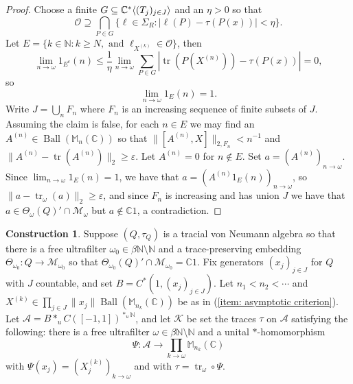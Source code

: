 \documentclass[10pt]{amsart}
\theoremstyle{definition}
\newtheorem{cons}[thm]{Construction}
\numberwithin{equation}{section}
\newcommand{\bC}{{\mathbb C}}
\newcommand{\bF}{{\mathbb F}}
\newcommand{\bM}{{\mathbb M}}
\newcommand{\bN}{{\mathbb N}}
\newcommand{\cA}{{\mathcal A}}
\newcommand{\cK}{{\mathcal K}}
\newcommand{\cM}{{\mathcal M}}
\DeclareMathOperator{\tr}{tr}
\DeclareMathOperator{\Ball}{Ball}
\DeclarePairedDelimiter{\ip}{\langle}{\rangle}
\begin{document}
\begin{proof}
Choose a finite $G\subseteq \bC^{*}\ip{(T_{j})_{j\in J}}$ and an $\eta>0$ so that 
\[\mathcal{O}\supseteq \bigcap_{P\in G}\{\ell\in \Sigma_{R}:|\ell(P)-\tau(P(x))|<\eta\}.\]
Let $E=\{k\in \bN:k\geq N, \text{ and }\ell_{X^{(k)}}\in \mathcal{O}\}$, then
\[\lim_{n\to\omega}1_{E^{c}}(n)\leq \frac{1}{\eta}\lim_{n\to\omega}\sum_{P\in G}|\tr(P(X^{(n)}))-\tau(P(x))|=0,\]
so
\[\lim_{n\to\omega}1_{E}(n)=1.\]
Write $J=\bigcup_{n}F_{n}$ where $F_{n}$ is an increasing sequence of finite subsets of $J$. Assuming the claim is false, for each $n\in E$  we may find an $A^{(n)}\in \Ball(\bM_{n}(\bC))$ so that $\|[A^{(n)},X]\|_{2,F_{n}}<n^{-1}$ and $\|A^{(n)}-\tr(A^{(n)})\|_{2}\geq \varepsilon$. Let $A^{(n)}=0$ for $n\notin E$.
Set $a=(A^{(n)})_{n\to\omega}$. Since $\lim_{n\to\omega}1_{E}(n)=1$, we have that $a=(A^{(n)}1_{E}(n))_{n\to\omega}$, so $\|a-\tr_{\omega}(a)\|_{2}\geq \varepsilon$, and since $F_{n}$ is increasing and has union $J$ we have that $a\in \Theta_{\omega}(Q)'\cap \cM_{\omega}$ but $a\notin \bC1$, a contradiction. 

     
\end{proof}

\begin{cons}\label{cons: preliminary construction}
Suppose $(Q,\tau_{Q})$ is a tracial von Neumann algebra so that there is a free ultrafilter $\omega_{0}\in \beta\bN\setminus\bN$ and a trace-preserving embedding $\Theta_{\omega_{0}}\colon Q\to \cM_{\omega_{0}}$ so that $\Theta_{\omega_{0}}(Q)'\cap \cM_{\omega_{0}}=\bC1$. Fix generators $(x_{j})_{j\in J}$ for $Q$ with $J$ countable, and set $B=C^{*}(1,(x_{j})_{j\in J})$. Let $n_{1}<n_{2}<\cdots$ and $X^{(k)}\in \prod_{j\in J}\|x_{j}\|\Ball(\bM_{n_{k}}(\bC))$ be as in (\ref{item: asymptotic criterion}). 
Let $\cA=B*_{u}C([-1,1])^{*_{u}\bN}$, and let $\cK$ be set the traces $\tau$ on $\cA$ satisfying the following: there is a free ultrafilter $\omega\in \beta\bN\setminus\bN$ and a unital $*$-homomorphism 
\[\Psi\colon \cA\to \prod_{k\to\omega}\bM_{n_{k}}(\bC)\] 
with $\Psi(x_{j})=(X^{(k)}_{j})_{k\to\omega}$ and with $\tau=\tr_{\omega}\circ \Psi$.  
\end{cons}

\end{document}
